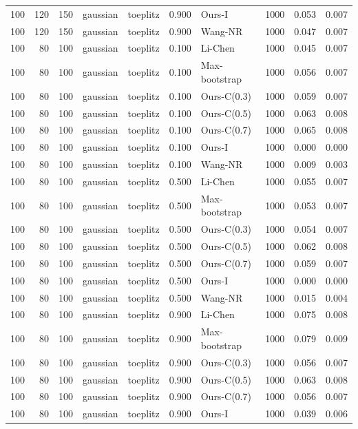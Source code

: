 \begin{tabular}{rrrllrlrrr}
100 & 120 & 150 & gaussian & toeplitz & 0.900 & Ours-I & 1000 & 0.053 & 0.007 \\
100 & 120 & 150 & gaussian & toeplitz & 0.900 & Wang-NR & 1000 & 0.047 & 0.007 \\
100 & 80 & 100 & gaussian & toeplitz & 0.100 & Li-Chen & 1000 & 0.045 & 0.007 \\
100 & 80 & 100 & gaussian & toeplitz & 0.100 & Max-bootstrap & 1000 & 0.056 & 0.007 \\
100 & 80 & 100 & gaussian & toeplitz & 0.100 & Ours-C(0.3) & 1000 & 0.059 & 0.007 \\
100 & 80 & 100 & gaussian & toeplitz & 0.100 & Ours-C(0.5) & 1000 & 0.063 & 0.008 \\
100 & 80 & 100 & gaussian & toeplitz & 0.100 & Ours-C(0.7) & 1000 & 0.065 & 0.008 \\
100 & 80 & 100 & gaussian & toeplitz & 0.100 & Ours-I & 1000 & 0.000 & 0.000 \\
100 & 80 & 100 & gaussian & toeplitz & 0.100 & Wang-NR & 1000 & 0.009 & 0.003 \\
100 & 80 & 100 & gaussian & toeplitz & 0.500 & Li-Chen & 1000 & 0.055 & 0.007 \\
100 & 80 & 100 & gaussian & toeplitz & 0.500 & Max-bootstrap & 1000 & 0.053 & 0.007 \\
100 & 80 & 100 & gaussian & toeplitz & 0.500 & Ours-C(0.3) & 1000 & 0.054 & 0.007 \\
100 & 80 & 100 & gaussian & toeplitz & 0.500 & Ours-C(0.5) & 1000 & 0.062 & 0.008 \\
100 & 80 & 100 & gaussian & toeplitz & 0.500 & Ours-C(0.7) & 1000 & 0.059 & 0.007 \\
100 & 80 & 100 & gaussian & toeplitz & 0.500 & Ours-I & 1000 & 0.000 & 0.000 \\
100 & 80 & 100 & gaussian & toeplitz & 0.500 & Wang-NR & 1000 & 0.015 & 0.004 \\
100 & 80 & 100 & gaussian & toeplitz & 0.900 & Li-Chen & 1000 & 0.075 & 0.008 \\
100 & 80 & 100 & gaussian & toeplitz & 0.900 & Max-bootstrap & 1000 & 0.079 & 0.009 \\
100 & 80 & 100 & gaussian & toeplitz & 0.900 & Ours-C(0.3) & 1000 & 0.056 & 0.007 \\
100 & 80 & 100 & gaussian & toeplitz & 0.900 & Ours-C(0.5) & 1000 & 0.063 & 0.008 \\
100 & 80 & 100 & gaussian & toeplitz & 0.900 & Ours-C(0.7) & 1000 & 0.056 & 0.007 \\
100 & 80 & 100 & gaussian & toeplitz & 0.900 & Ours-I & 1000 & 0.039 & 0.006 \\

\end{tabular}
